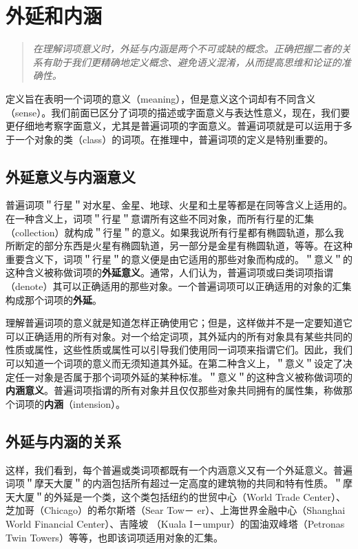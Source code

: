 \section{外延和内涵}

\begin{quotation}
\textit{在理解词项意义时，外延与内涵是两个不可或缺的概念。正确把握二者的关系有助于我们更精确地定义概念、避免语义混淆，从而提高思维和论证的准确性。}
\end{quotation}

定义旨在表明一个词项的意义（meaning），但是意义这个词却有不同含义（sense）。我们前面已区分了词项的描述或字面意义与表达性意义，现在，我们要更仔细地考察字面意义，尤其是普遍词项的字面意义。普遍词项就是可以运用于多于一个对象的类（class）的词项。在推理中，普遍词项的定义是特别重要的。

\subsection{外延意义与内涵意义}

普遍词项＂行星＂对水星、金星、地球、火星和土星等都是在同等含义上适用的。在一种含义上，词项＂行星＂意谓所有这些不同对象，而所有行星的汇集（collection）就构成＂行星＂的意义。如果我说所有行星都有椭圆轨道，那么我所断定的部分东西是火星有椭圆轨道，另一部分是金星有椭圆轨道，等等。在这种重要含义下，词项＂行星＂的意义便是由它适用的那些对象而构成的。＂意义＂的这种含义被称做词项的\textbf{外延意义}。通常，人们认为，普遍词项或曰类词项指谓（denote）其可以正确适用的那些对象。一个普遍词项可以正确适用的对象的汇集构成那个词项的\textbf{外延}。

理解普遍词项的意义就是知道怎样正确使用它；但是，这样做并不是一定要知道它可以正确适用的所有对象。对一个给定词项，其外延内的所有对象具有某些共同的性质或属性，这些性质或属性可以引导我们使用同一词项来指谓它们。因此，我们可以知道一个词项的意义而无须知道其外延。在第二种含义上，＂意义＂设定了决定任一对象是否属于那个词项外延的某种标准。＂意义＂的这种含义被称做词项的\textbf{内涵意义}。普遍词项指谓的所有对象并且仅仅那些对象共同拥有的属性集，称做那个词项的\textbf{内涵}（intension）。

\subsection{外延与内涵的关系}

这样，我们看到，每个普遍或类词项都既有一个内涵意义又有一个外延意义。普遍词项＂摩天大厦＂的内涵包括所有超过一定高度的建筑物的共同和特有性质。＂摩天大厦＂的外延是一个类，这个类包括纽约的世贸中心（World Trade Center）、芝加哥（Chicago）的希尔斯塔（Sear Tow－ er）、上海世界金融中心（Shanghai World Financial Center）、吉隆坡 （Kuala I－umpur）的国油双峰塔（Petronas Twin Towers）等等，也即该词项适用对象的汇集。

